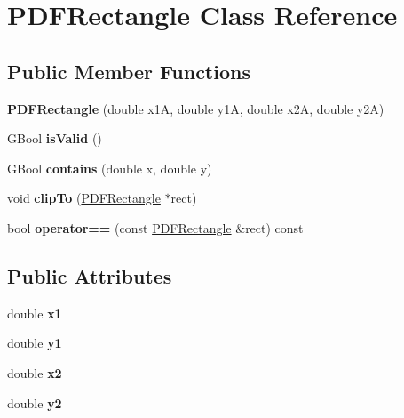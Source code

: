 \hypertarget{class_p_d_f_rectangle}{}\section{P\+D\+F\+Rectangle Class Reference}
\label{class_p_d_f_rectangle}
\subsection*{Public Member Functions}
\begin{DoxyCompactItemize}
\item 
\mbox{\label{class_p_d_f_rectangle_a094e1ed1dc99ed5b0cee80af0301d3bf}} 
{\bfseries P\+D\+F\+Rectangle} (double x1A, double y1A, double x2A, double y2A)
\item 
\mbox{\label{class_p_d_f_rectangle_af4d88aae63d943a9bf2e7bcac054ba6e}} 
G\+Bool {\bfseries is\+Valid} ()
\item 
\mbox{\label{class_p_d_f_rectangle_ae4b34b7e1380762209c6aa306c74205b}} 
G\+Bool {\bfseries contains} (double x, double y)
\item 
\mbox{\label{class_p_d_f_rectangle_a608631c57f132d49ef5ab948ef9a3ad2}} 
void {\bfseries clip\+To} (\hyperlink{class_p_d_f_rectangle}{P\+D\+F\+Rectangle} $\ast$rect)
\item 
\mbox{\label{class_p_d_f_rectangle_a6bc29abf6ba0d1fed14b6f9ff11e69ad}} 
bool {\bfseries operator==} (const \hyperlink{class_p_d_f_rectangle}{P\+D\+F\+Rectangle} \&rect) const
\end{DoxyCompactItemize}
\subsection*{Public Attributes}
\begin{DoxyCompactItemize}
\item 
\mbox{\label{class_p_d_f_rectangle_a4300fd3482053171606ab1795f6469af}} 
double {\bfseries x1}
\item 
\mbox{\label{class_p_d_f_rectangle_acd383c26cf70e92443ddf8adbbcf0525}} 
double {\bfseries y1}
\item 
\mbox{\label{class_p_d_f_rectangle_a05f3ebe223929b336e8e7bdd52f837b8}} 
double {\bfseries x2}
\item 
\mbox{\label{class_p_d_f_rectangle_a33b37c4e5492a66e7e22ed3c539dace3}} 
double {\bfseries y2}
\end{DoxyCompactItemize}



